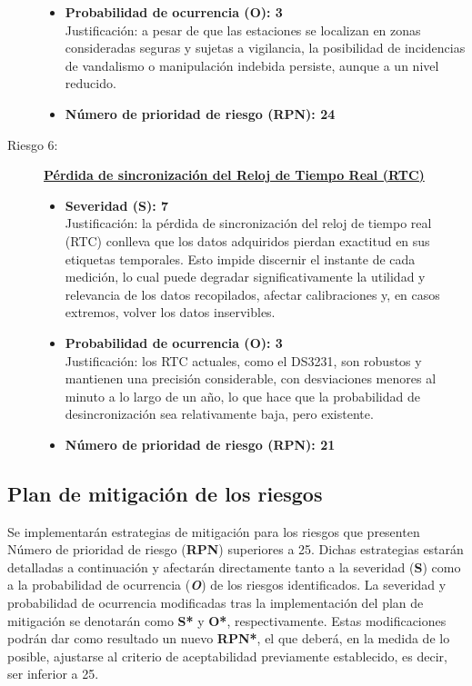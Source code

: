 \begin{description}
\begin{itemize}
		\item \textbf{Probabilidad de ocurrencia (O): 3} \\
		Justificación: a pesar de que las estaciones se localizan en zonas consideradas seguras y sujetas a vigilancia, la posibilidad de incidencias de vandalismo o manipulación indebida persiste, aunque a un nivel reducido.
		
		\item \textbf{Número de prioridad de riesgo (RPN): 24} \\
	\end{itemize}

	
\item[Riesgo 6:] \underline{\textbf{Pérdida de sincronización del Reloj de Tiempo Real (RTC)}}
\begin{itemize}
	\item \textbf{Severidad (S): 7} \\
	Justificación: la pérdida de sincronización del reloj de tiempo real (RTC) conlleva que los datos adquiridos pierdan exactitud en sus etiquetas temporales. Esto impide discernir el instante de cada medición, lo cual puede degradar significativamente la utilidad y relevancia de los datos recopilados, afectar calibraciones y, en casos extremos, volver los datos inservibles.
	
	\item \textbf{Probabilidad de ocurrencia (O): 3} \\
	Justificación: los RTC actuales, como el DS3231, son robustos y mantienen una precisión considerable, con desviaciones menores al minuto a lo largo de un año, lo que hace que la probabilidad de desincronización sea relativamente baja, pero existente.
	
	\item \textbf{Número de prioridad de riesgo (RPN): 21} \\
\end{itemize}




\end{description}


\subsection{Plan de mitigación de los riesgos}

Se implementarán estrategias de mitigación para los riesgos que presenten Número de prioridad de riesgo (\textbf{RPN}) superiores a 25. Dichas estrategias estarán detalladas a continuación y afectarán directamente tanto a la severidad (\textbf{S}) como a la probabilidad de ocurrencia (\textbf{\textit{O}}) de los riesgos identificados. La severidad y probabilidad de ocurrencia modificadas tras la implementación del plan de mitigación se denotarán como \textbf{S*} y \textbf{O*}, respectivamente. Estas modificaciones podrán dar como resultado un nuevo \textbf{RPN*}, el que deberá, en la medida de lo posible, ajustarse al criterio de aceptabilidad previamente establecido, es decir, ser inferior a 25.

